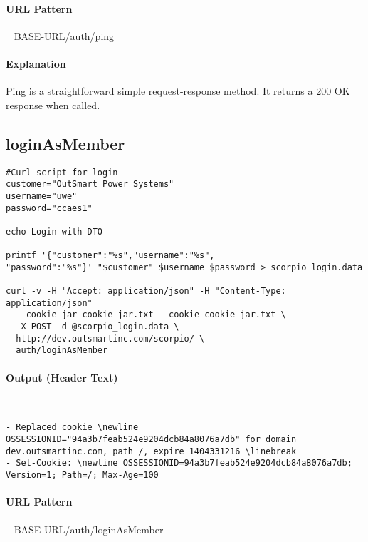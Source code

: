 \documentclass[
10pt, %
letterpaper, %
oneside, %
headinclude,footinclude, %
BCOR5mm, %
]{scrartcl}
\begin{document}
\paragraph{URL Pattern} 
~\newline
BASE-URL/auth/ping

\paragraph{Explanation} Ping is a straightforward simple request-response method. It returns a 200 OK response when called.


\subsection{\textbf{loginAsMember}}

\begin{lstlisting}
#Curl script for login
customer="OutSmart Power Systems"
username="uwe"
password="ccaes1"

echo Login with DTO

printf '{"customer":"%s","username":"%s",
"password":"%s"}' "$customer" $username $password > scorpio_login.data 

curl -v -H "Accept: application/json" -H "Content-Type: application/json" 
  --cookie-jar cookie_jar.txt --cookie cookie_jar.txt \
  -X POST -d @scorpio_login.data \
  http://dev.outsmartinc.com/scorpio/ \
  auth/loginAsMember

\end{lstlisting}

\paragraph{Output (Header Text)}~
\begin{lstlisting}
- Replaced cookie \newline OSSESSIONID="94a3b7feab524e9204dcb84a8076a7db" for domain dev.outsmartinc.com, path /, expire 1404331216 \linebreak
- Set-Cookie: \newline OSSESSIONID=94a3b7feab524e9204dcb84a8076a7db; Version=1; Path=/; Max-Age=100
\end{lstlisting}

\paragraph{URL Pattern} 
~\newline
BASE-URL/auth/loginAsMember
\end{document}
